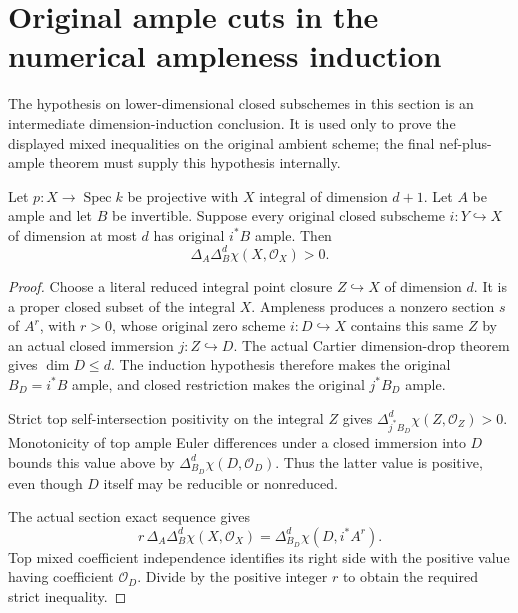\section{Original ample cuts in the numerical ampleness induction}

The hypothesis on lower-dimensional closed subschemes in this section is
an intermediate dimension-induction conclusion. It is used only to prove
the displayed mixed inequalities on the original ambient scheme; the
final nef-plus-ample theorem must supply this hypothesis internally.

\begin{lemma}
\label{lem:native-nef-ample-first-cut-positive}
\leanok
{}
Let $p:X\to\operatorname{Spec}k$ be projective with $X$ integral
of dimension $d+1$. Let $A$ be ample and let $B$ be invertible.
Suppose every original closed subscheme $i:Y\hookrightarrow X$
of dimension at most $d$ has original $i^*B$ ample. Then
\[
 \Delta_A\Delta_B^d\chi(X,\mathcal O_X)>0.
\]
\end{lemma}
\begin{proof}
Choose a literal reduced integral point closure $Z\hookrightarrow X$
of dimension $d$. It is a proper closed subset of the integral
$X$. Ampleness produces a nonzero section $s$ of $A^r$, with
$r>0$, whose original zero scheme $i:D\hookrightarrow X$ contains
this same $Z$ by an actual closed immersion $j:Z\hookrightarrow D$.
The actual Cartier dimension-drop theorem gives $\dim D\leq d$.
The induction hypothesis therefore makes the original $B_D=i^*B$
ample, and closed restriction makes the original $j^*B_D$ ample.

Strict top self-intersection positivity on the integral $Z$ gives
$\Delta_{j^*B_D}^d\chi(Z,\mathcal O_Z)>0$. Monotonicity of top
ample Euler differences under a closed immersion into $D$ bounds
this value above by $\Delta_{B_D}^d\chi(D,\mathcal O_D)$.
Thus the latter value is positive, even though $D$ itself may be
reducible or nonreduced.

The actual section exact sequence gives
\[
 r\,\Delta_A\Delta_B^d\chi(X,\mathcal O_X)
 =\Delta_{B_D}^d\chi(D,i^*A^r).
\]
Top mixed coefficient independence identifies its right side with
the positive value having coefficient $\mathcal O_D$. Divide by
the positive integer $r$ to obtain the required strict inequality.
\end{proof}

